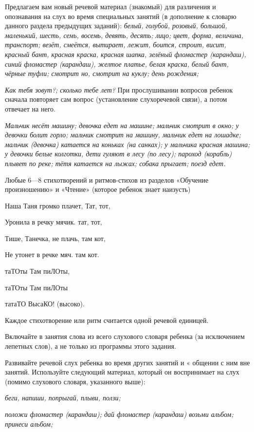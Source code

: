 \documentclass{book}
\renewcommand{\emph}[1]{\textit{#1}}
\begin{document}
Предлагаем вам новый речевой материал (знакомый) для различения и
опознавания на слух во время специальных занятий (в дополнение к словарю
данного раздела предыдущих заданий): \emph{белый, голубой, розовый,
большой, маленький, шесть, семь, восемь, девять, десять; лицо; цвет,
форма, величина, транспорт; везёт, смеётся, вытирает, лежит, боится,
строит, висит, красный бант, красная краска, красная шапка, зелёный
фломастер (карандаш), синий фломастер (карандаш), желтое платье, белая
краска, белый бант, чёрные туфли; смотрит но, смотрит на куклу; день
рождения;}

\emph{Как тебя зовут?; сколько тебе лет?} При прослушивании вопросов
ребенок сначала повторяет сам вопрос (установление слухоречевой связи),
а потом отвечает на него.

\emph{Мальчик несёт машину; девочка едет на машине; мальчик смотрит в
окно; у девочки болит горло; мальчик смотрит на машину, мальчик едет на
лошадке; мальчик (девочка) катается на коньках (на санках); у мальчика
красная машина; у девочки белые колготки, дети гуляют в лесу (по лесу);
пароход (корабль) плывет по реке; тётя катается на лыжах; собака
прыгает; поезд едет.}

Любые 6---8 стихотворений и ритмов-стихов из разделов «Обучение
произношению» и «Чтение» (которое ребенок знает наизусть)

Наша Таня громко плачет, Тат, тот,

Уронила в речку мячик. тат, тот,

Тише, Танечка, не плачь, там кот,

Не утонет в речке мяч. там кот.

таТОты Там пиЛОты,

таТОты Там пиЛОты

татаТО ВысаКО! (высоко).

Каждое стихотворение или ритм считается одной речевой единицей.

Включайте в занятия слова из всего слухового словаря ребенка (за
исключением лепетных слов), а не только из программы этого задания.

Развивайте речевой слух ребенка во время других занятий и « общении с
ним вне занятий. Используйте следующий материал, который он воспринимает
на слух (помимо слухового словаря, указанного выше):

\emph{беги, напиши, попрыгай, плыви, ползи;}

\emph{положи фломастер (карандаш); дай фломастер (карандаш) возьми
альбом; принеси альбом;}
\end{document}
